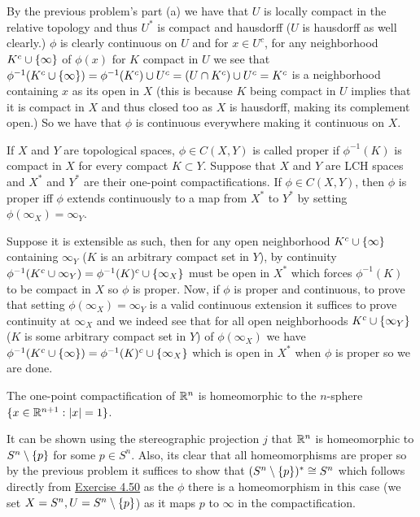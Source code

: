 \documentclass[12pt,a4paper]{article}
\begin{document}
\begin{solution}
By the previous problem's part (a) we have that $U$ is locally compact in the relative topology and thus $U^*$ is compact and hausdorff ($U$ is hausdorff as well clearly.) 
$\phi$ is clearly continuous on $U$ and for $x\in U^c$, for any neighborhood $K^c\cup \qty{\infty}$ of $\phi(x)$ for $K$ compact in $U$ we see that $\phi^{-1}(K^c\cup \qty{\infty})=\phi^{-1}(K^c)\cup U^c=(U\cap K^c)\cup U^c=K^c$ is a neighborhood containing $x$ as its open in $X$ (this is because $K$ being compact in $U$ implies that it is compact in $X$ and thus closed too as $X$ is hausdorff, making its complement open.) 
So we have that $\phi$ is continuous everywhere making it continuous on $X.$ 
\end{solution}
\begin{problem}\label{prob:4-51}
If $X$ and $Y$ are topological spaces, $\phi \in C(X,Y)$ is called proper if $\phi^{-1}(K)$ is compact in $X$ for every compact $K \subset Y$. Suppose that $X$ and $Y$ are LCH spaces and $X^*$ and $Y^*$ are their one-point compactifications. If $\phi \in C(X,Y)$, then $\phi$ is proper iff $\phi$ extends continuously to a map from $X^*$ to $Y^*$ by setting $\phi(\infty_X) = \infty_Y$.
\end{problem}
\begin{solution}
    Suppose it is extensible as such, then for any open neighborhood $K^c\cup \qty{\infty}$ containing $\infty_Y$ ($K$ is an arbitrary compact set in $Y$), by continuity $\phi^{-1}(K^c\cup\infty_Y)=\phi^{-1}(K)^c\cup \qty{\infty_X}$ must be open in $X^*$ which forces $\phi^{-1}(K)$ to be compact in $X$ so $\phi$ is proper. 
    Now, if $\phi$ is proper and continuous, to prove that setting $\phi(\infty_X)=\infty_Y$ is a valid continuous extension it suffices to prove continuity at $\infty_X$ and we indeed see that for all open neighborhoods $K^c\cup \qty{\infty_Y}$ ($K$ is some arbitrary compact set in $Y$) of $\phi(\infty_X)$ we have $\phi^{-1}(K^c\cup \qty{\infty})=\phi^{-1}(K)^c\cup \qty{\infty_X}$ which is open in $X^*$ when $\phi$ is proper so we are done. 
\end{solution}
\begin{problem}\label{prob:4-52}
The one-point compactification of $\mathbb{R}^n$ is homeomorphic to the $n$-sphere $\{x \in \mathbb{R}^{n+1} : |x| = 1\}$.
\end{problem}
\begin{solution}
It can be shown using the stereographic projection $j$ that $\mathbb{R}^n$ is homeomorphic to $S^n\setminus \qty{p}$ for some $p\in S^n$. 
Also, its clear that all homeomorphisms are proper so by the previous problem it suffices to show that $(S^n\setminus \qty{p})^*\cong S^n$ which follows directly from \hyperref[prob:4-50]{Exercise 4.50} as the $\phi$ there is a homeomorphism in this case (we set $X=S^n,U=S^n\setminus \qty{p}$) as it maps $p$ to $\infty$ in the compactification. 
\end{solution}
\end{document}
